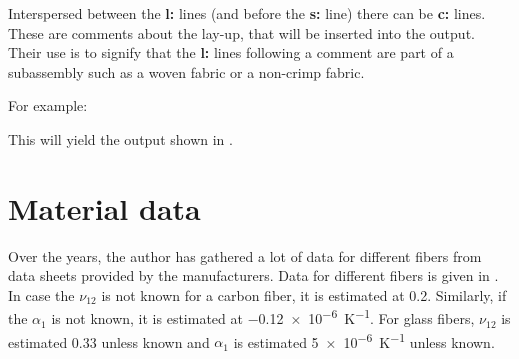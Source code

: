 \documentclass[a4paper,landscape,oneside,11pt,twocolumn]{memoir}
\begin{document}
Interspersed between the \textbf{l:} lines (and before the \textbf{s:} line)
there can be \textbf{c:} lines.
These are comments about the lay-up, that will be inserted into the output.
Their use is to signify that the \textbf{l:} lines following a comment are
part of a subassembly such as a woven fabric or a non-crimp fabric.

For example:


This will yield the output shown in .



\section{Material data} %

Over the years, the author has gathered a lot of data for different fibers
from data sheets provided by the manufacturers. Data for different
fibers is given in . In case the $\nu_{12}$ is not
known for a carbon fiber, it is estimated at 0.2. Similarly, if the
$\alpha_1$ is not known, it is estimated at \SI{-0.12e-6}{K^{-1}}. For glass
fibers, $\nu_{12}$ is estimated 0.33 unless known and $\alpha_1$ is estimated
\SI{5e-6}{K^{-1}} unless known.
\end{document}
